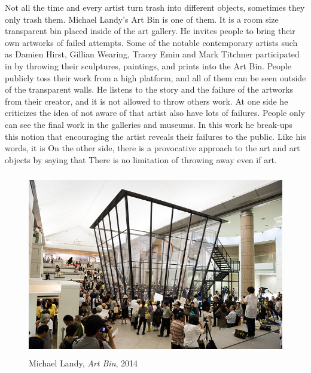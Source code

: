 Not all the time and every artist turn trash into different objects, sometimes they only trash them. Michael Landy’s Art Bin is one of them. It is a room size transparent bin placed inside of the art gallery. He invites people to bring their own artworks of failed attempts. Some of the notable contemporary artists such as Damien Hirst, Gillian Wearing, Tracey Emin and Mark Titchner participated in by throwing their sculptures, paintings, and prints into the Art Bin. People publicly toss their work from a high platform, and all of them can be seen outside of the transparent walls. He listens to the story and the failure of the artworks from their creator, and it is not allowed to throw others work. At one side he criticizes the idea of not aware of that artist also have lots of failures. People only can see the final work in the galleries and museums. In this work he break-ups this notion that encouraging the artist reveals their failures to the public. Like his words, it is  On the other side, there is a provocative approach to the art and art objects by saying that  There is no limitation of throwing away even if art. 

\begin{figure}[h!]
  \centering
  \includegraphics[height=8cm]{graphics/MichaelLandy_ArtBin.jpg}
  \caption{Michael Landy, \textit{Art Bin}, 2014}
  \label{fig:MichaelLandy_ArtBin}
\end{figure}


